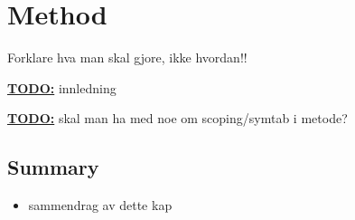 \chapter{Method}
\label{chapter:method}
Forklare hva man skal gjore, ikke hvordan!!

\textbf{\underline{\LARGE TODO:}} innledning

\textbf{\underline{\LARGE TODO:}} skal man ha med noe om scoping/symtab i
metode?






\section{Summary}
\label{sect:method:summary}
\begin{itemize}
  \item sammendrag av dette kap
\end{itemize}